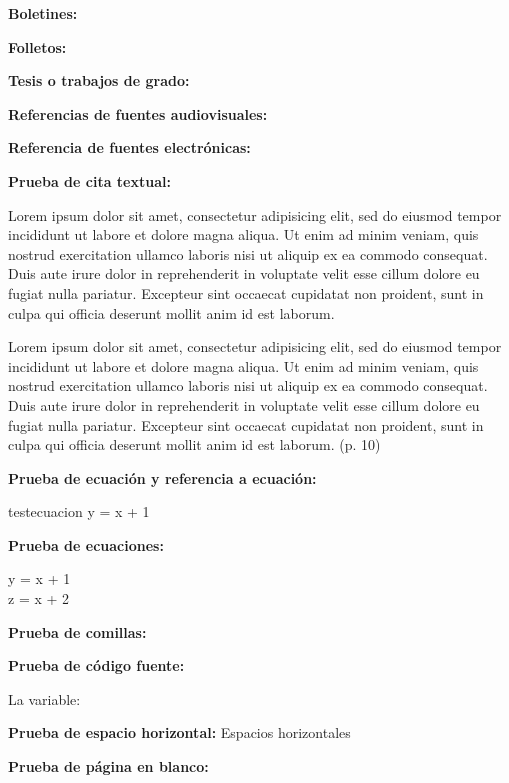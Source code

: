 \documentclass{uclamsc}
\begin{document}
\begin{contenido}
\textbf{Boletines:}

\textbf{Folletos:}

\textbf{Tesis o trabajos de grado:}

\textbf{Referencias de fuentes audiovisuales:}

\textbf{Referencia de fuentes electrónicas:}


\break

\espaciodoble\textbf{Prueba de cita textual:}

Lorem ipsum dolor sit amet, consectetur adipisicing elit, sed do eiusmod tempor incididunt ut labore et dolore magna aliqua. Ut enim ad minim veniam, quis nostrud exercitation ullamco laboris nisi ut aliquip ex ea commodo consequat. Duis aute irure dolor in reprehenderit in voluptate velit esse cillum dolore eu fugiat nulla pariatur. Excepteur sint occaecat cupidatat non proident, sunt in culpa qui officia deserunt mollit anim id est laborum.

\begin{citatextual}
Lorem ipsum dolor sit amet, consectetur adipisicing elit, sed do eiusmod tempor incididunt ut labore et dolore magna aliqua. Ut enim ad minim veniam, quis nostrud exercitation ullamco laboris nisi ut aliquip ex ea commodo consequat. Duis aute irure dolor in reprehenderit in voluptate velit esse cillum dolore eu fugiat nulla pariatur. Excepteur sint occaecat cupidatat non proident, sunt in culpa qui officia deserunt mollit anim id est laborum.
(p. 10)
\end{citatextual}

\espaciodoble\textbf{Prueba de ecuación y referencia a ecuación:}


\begin{ecuacion}{testecuacion}
	y = x + 1
\end{ecuacion}

\espaciodoble\textbf{Prueba de ecuaciones:}

\begin{ecuaciones}
	y = x + 1 \\
	z = x + 2
\end{ecuaciones}

\espaciodoble\textbf{Prueba de comillas:}


\espaciodoble\textbf{Prueba de código fuente:}

La variable: 

\espaciodoble\textbf{Prueba de espacio horizontal:}
Espacios  horizontales

\espaciodoble\textbf{Prueba de página en blanco:}
\pagenblanco

\end{contenido}

\hacerbibliografia
\end{document}
